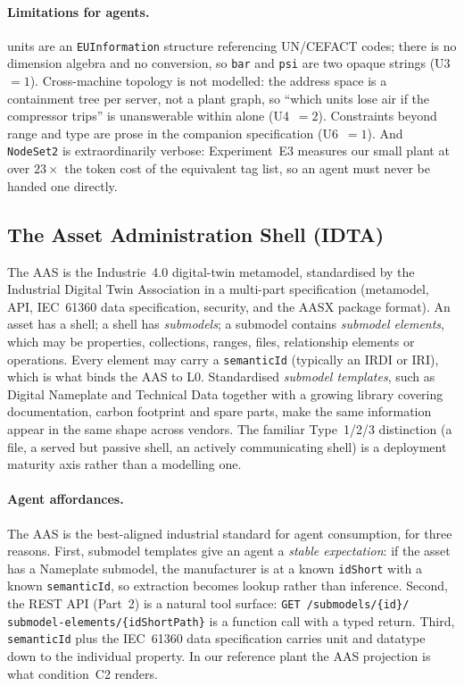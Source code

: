\paragraph{Limitations for agents.} \opcua{} units are an
\texttt{EUInformation} structure referencing UN/CEFACT codes; there is no
dimension algebra and no conversion, so \texttt{bar} and \texttt{psi} are two
opaque strings (U3~$=1$). Cross-machine topology is not modelled: the address
space is a containment tree per server, not a plant graph, so ``which units lose
air if the compressor trips'' is unanswerable within \opcua{} alone
(U4~$=2$). Constraints beyond range and type are prose in the companion
specification (U6~$=1$). And \texttt{NodeSet2} is extraordinarily verbose:
Experiment~E3 measures our small plant at over $23\times$ the token cost of the
equivalent tag list, so an agent must never be handed one directly.

\subsection{The Asset Administration Shell (IDTA)}

The AAS \cite{idta2023aas} is the Industrie~4.0 digital-twin metamodel,
standardised by the Industrial Digital Twin Association in a multi-part
specification (metamodel, API, IEC~61360 data specification, security, and the
AASX package format). An
asset has a shell; a shell has \emph{submodels}; a submodel contains
\emph{submodel elements}, which may be properties, collections, ranges, files,
relationship elements or operations. Every element may carry a
\texttt{semanticId} (typically an IRDI or IRI), which is what binds the AAS to
L0. Standardised \emph{submodel templates}, such as Digital Nameplate and
Technical Data \cite{idta2023nameplate} together with a growing library covering
documentation, carbon footprint and spare parts, make the same information
appear in the same shape across vendors. The familiar Type~1/2/3
distinction (a file, a served but passive shell, an actively communicating
shell) is a deployment maturity axis rather than a modelling one.

\paragraph{Agent affordances.} The AAS is the best-aligned industrial standard
for agent consumption, for three reasons. First, submodel templates give an
agent a \emph{stable expectation}: if the asset has a Nameplate submodel, the
manufacturer is at a known \texttt{idShort} with a known \texttt{semanticId}, so
extraction becomes lookup rather than inference. Second, the REST API
(Part~2) is a natural tool surface: \texttt{GET /submodels/\{id\}/\allowbreak
submodel-elements/\{idShortPath\}} is a function call with a typed return.
Third, \texttt{semanticId} plus the IEC~61360 data specification carries unit and
datatype down to the individual property. In our reference plant the AAS
projection is what condition~C2 renders.

